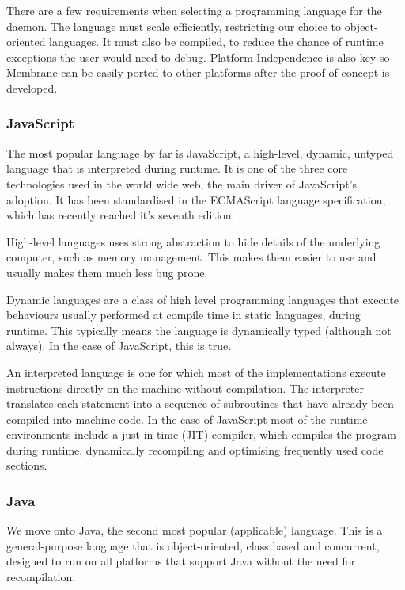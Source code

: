 \documentclass[11pt, a4paper, twoside]{report}
\begin{document}
There are a few requirements when selecting a programming language for the daemon. The language must scale efficiently, restricting our choice to object-oriented languages. It must also be compiled, to reduce the chance of runtime exceptions the user would need to debug. Platform Independence is also key so Membrane can be easily ported to other platforms after the proof-of-concept is developed.

\subsubsection{JavaScript}

The most popular language by far is JavaScript, a high-level, dynamic, untyped language that is interpreted during runtime. \citep{flanagan2011javascript} It is one of the three core technologies used in the world wide web, the main driver of JavaScript's adoption. It has been standardised in the ECMAScript language specification, which has recently reached it's seventh edition. \citep{stefanov2010javascript}.

High-level languages uses strong abstraction to hide details of the underlying computer, such as memory management. This makes them easier to use and usually makes them much less bug prone.

Dynamic languages are a class of high level programming languages that execute behaviours usually performed at compile time in static languages, during runtime. \citep{trattdyamicallytypedlanguages} This typically means the language is dynamically typed (although not always). In the case of JavaScript, this is true.

An interpreted language is one for which most of the implementations execute instructions directly on the machine without compilation. The interpreter translates each statement into a sequence of subroutines that have already been compiled into machine code. In the case of JavaScript most of the runtime environments include a just-in-time (JIT) compiler, which compiles the program during runtime, dynamically recompiling and optimising frequently used code sections. \citep{aycock2003brief}

\subsubsection{Java}

We move onto Java, the second most popular (applicable) language. This is a general-purpose language that is object-oriented, class based and concurrent, \citep{gosling2014java} designed to run on all platforms that support Java without the need for recompilation. \citep{gosling1995java}
\end{document}

